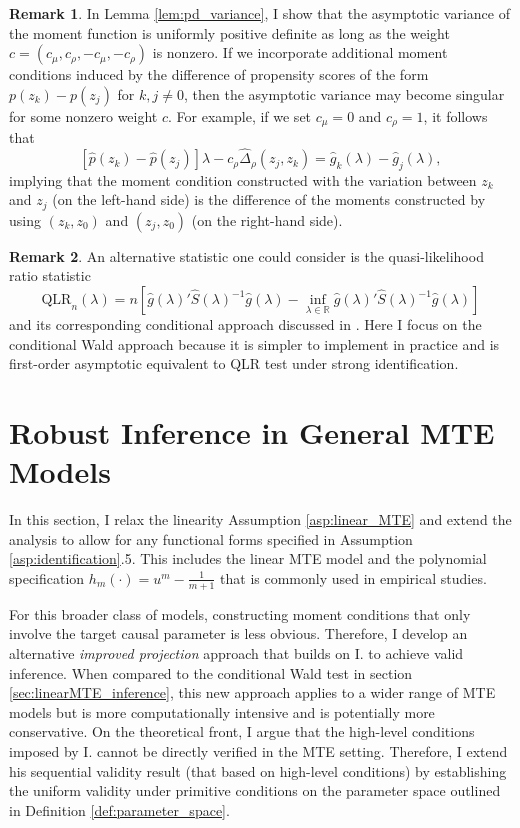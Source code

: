 \documentclass[11pt]{article}
\theoremstyle{definition}
\newtheorem{remark}{Remark}[section]
\newcommand{\R}{\ensuremath{\mathbb{R}}}
\newcommand{\0}{\ensuremath{\mathbf{0}}}
\begin{document}
\begin{bibunit}
\begin{remark}
In Lemma \ref{lem:pd_variance}, I show that the asymptotic variance of the moment function is uniformly positive definite as long as the weight $c = (c_\mu, c_\rho, -c_\mu, -c_\rho)$ is nonzero. If we incorporate additional moment conditions induced by the difference of propensity scores of the form $p(z_k) - p(z_j)$ for $k, j \neq 0$, then the asymptotic variance may become singular for some nonzero weight $c$. For example, if we set $c_\mu = 0$ and $c_\rho = 1$, it follows that 
\[
    [\hat{p}(z_k) - \hat{p}(z_j)]\lambda - c_\rho\hat{\Delta}_\rho(z_j,z_k) = \hat{g}_k(\lambda) - \hat{g}_j(\lambda), 
\]
implying that the moment condition constructed with the variation between $z_k$ and $z_j$ (on the left-hand side) is the difference of the moments constructed by using $(z_k, z_0)$ and $(z_j, z_0)$ (on the right-hand side).
\end{remark}

\begin{remark}
    An alternative statistic one could consider is the quasi-likelihood ratio statistic
    \[
        \text{QLR}_n(\lambda) = n\left[\hat{g}(\lambda)'\hat{S}(\lambda)^{-1}\hat{g}(\lambda) - \inf_{\lambda \in \R} \hat{g}(\lambda)'\hat{S}(\lambda)^{-1}\hat{g}(\lambda)\right]
    \]
    and its corresponding conditional approach discussed in \cite{andrews/mikusheva:2016b}. Here I focus on the conditional Wald approach because it is simpler to implement in practice and is first-order asymptotic equivalent to QLR test under strong identification.
\end{remark}



\section{Robust Inference in General MTE Models}
\label{sec:polyMTE_inference}
In this section, I relax the linearity Assumption \ref{asp:linear_MTE} and extend the analysis to allow for any functional forms specified in Assumption \ref{asp:identification}.5. This includes the linear MTE model and the polynomial specification $h_m(\cdot) = u^{m} - \frac{1}{m+1}$ that is commonly used in empirical studies. 

For this broader class of models, constructing moment conditions that only involve the target causal parameter is less obvious. Therefore, I develop an alternative \textit{improved projection} approach that builds on I. \cite{andrews.i:2018} to achieve valid inference. When compared to the conditional Wald test in section \ref{sec:linearMTE_inference}, this new approach applies to a wider range of MTE models but is more computationally intensive and is potentially more conservative. On the theoretical front, I argue that the high-level conditions imposed by I. \cite{andrews.i:2018} cannot be directly verified in the MTE setting. Therefore, I extend his sequential validity result (that based on high-level conditions) by establishing the uniform validity under primitive conditions on the parameter space outlined in Definition \ref{def:parameter_space}.


\end{bibunit}
\end{document}
